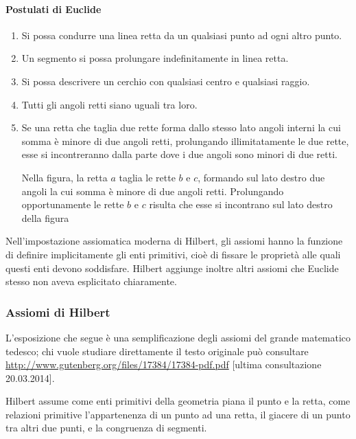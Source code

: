 {\paragraph{Postulati di Euclide}
\begin{enumerate}[label=\Roman{*}.]
\item Si possa condurre una linea retta da un qualsiasi punto ad ogni altro punto.
\item Un segmento si possa prolungare indefinitamente in linea retta.
\item Si possa descrivere un cerchio con qualsiasi centro e qualsiasi raggio.
\item Tutti gli angoli retti siano uguali tra loro.
\item Se una retta che taglia due rette forma dallo stesso lato angoli interni la cui somma è minore di due angoli retti, prolungando illimitatamente le due rette, esse si incontreranno dalla parte dove i due angoli sono minori di due retti.

 \begin{minipage}{.45\textwidth}
 \centering
 \end{minipage}\hfil
 \begin{minipage}{.45\textwidth}
 Nella figura, la retta $ a $ taglia le rette $ b $ e $ c $, formando sul lato destro due angoli la cui somma è minore di due angoli retti. Prolungando opportunamente le rette $ b $ e $ c $ risulta che esse si incontrano sul lato destro della figura
  \end{minipage}
\end{enumerate}

Nell'impostazione assiomatica moderna di Hilbert, gli assiomi hanno la funzione di definire implicitamente gli enti primitivi, cioè di fissare le proprietà alle quali questi enti devono soddisfare. Hilbert aggiunge inoltre altri assiomi che Euclide stesso non aveva esplicitato chiaramente.

\subsubsection*{Assiomi di Hilbert}

L'esposizione che segue è una semplificazione degli assiomi del grande matematico tedesco; chi vuole studiare direttamente il testo originale può consultare \url{http://www.gutenberg.org/files/17384/17384-pdf.pdf} [ultima consultazione 20.03.2014].

Hilbert assume come enti primitivi della geometria piana il punto e la retta, come relazioni primitive l’appartenenza di un punto ad una retta, il giacere di un punto tra altri due punti, e la congruenza di segmenti.

}
